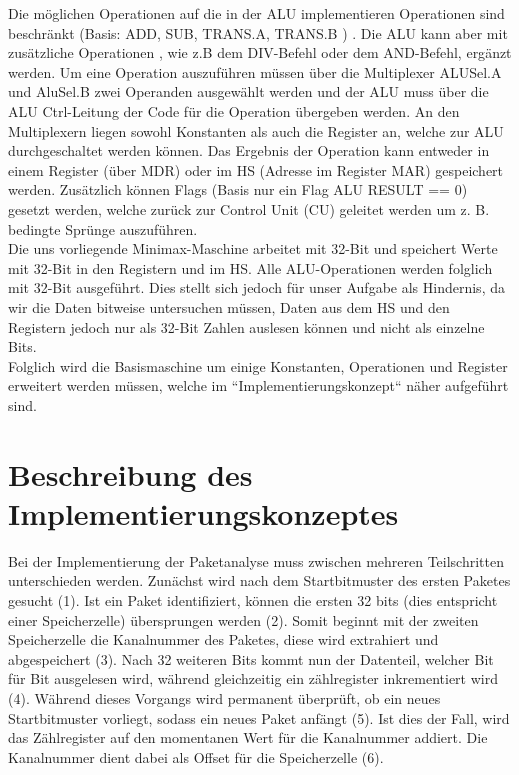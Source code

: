 \documentclass[12pt,titlepage,german,a4]{article}
\begin{document}
    Die m{\"o}glichen Operationen auf die in der ALU implementieren Operationen sind beschr{\"a}nkt (Basis:  ADD, SUB, TRANS.A, TRANS.B ) . Die ALU kann aber mit zus{\"a}tzliche Operationen , wie z.B dem DIV-Befehl oder dem AND-Befehl, erg{\"a}nzt werden.
    Um eine Operation auszuf{\"u}hren m{\"u}ssen {\"u}ber die Multiplexer ALUSel.A und AluSel.B zwei
    Operanden ausgew{\"a}hlt werden und der ALU muss {\"u}ber die ALU Ctrl-Leitung der Code
    f{\"u}r die Operation {\"u}bergeben werden. An den Multiplexern liegen sowohl Konstanten als
    auch die Register an, welche zur ALU durchgeschaltet werden k{\"o}nnen. Das Ergebnis der
    Operation kann entweder in einem Register ({\"u}ber MDR) oder im HS (Adresse im Register
    MAR) gespeichert werden. Zus{\"a}tzlich k{\"o}nnen Flags (Basis nur ein Flag ALU RESULT ==
    0) gesetzt werden, welche zur{\"u}ck zur Control Unit (CU) geleitet werden um z. B. bedingte
    Spr{\"u}nge auszuf{\"u}hren. \\
    Die uns vorliegende Minimax-Maschine arbeitet mit 32-Bit und speichert Werte mit
    32-Bit in den Registern und im HS. Alle ALU-Operationen werden folglich mit 32-Bit ausgef{\"u}hrt. Dies stellt sich jedoch f{\"u}r unser Aufgabe als Hindernis, da wir die Daten
    bitweise untersuchen m{\"u}ssen, Daten aus dem HS und den Registern jedoch nur als 32-Bit
    Zahlen auslesen k{\"o}nnen und nicht als einzelne Bits.\\
    Folglich wird die Basismaschine um einige Konstanten, Operationen und Register erweitert
    werden m{\"u}ssen, welche im “Implementierungskonzept“ n{\"a}her aufgef{\"u}hrt sind.

    \section{Beschreibung des Implementierungskonzeptes}
    Bei der Implementierung der Paketanalyse muss zwischen mehreren Teilschritten unterschieden werden. Zun{\"a}chst wird nach dem Startbitmuster des ersten Paketes gesucht (1). Ist ein Paket identifiziert, k{\"o}nnen die ersten 32 bits (dies entspricht einer Speicherzelle) {\"u}bersprungen werden (2). Somit beginnt mit der zweiten Speicherzelle die Kanalnummer des Paketes, diese wird extrahiert und abgespeichert (3). Nach 32 weiteren Bits kommt nun der Datenteil, welcher Bit f{\"u}r Bit ausgelesen wird, w{\"a}hrend gleichzeitig ein z{\"a}hlregister inkrementiert wird (4). W{\"a}hrend dieses Vorgangs wird permanent {\"u}berpr{\"u}ft, ob ein neues Startbitmuster vorliegt, sodass ein neues Paket anf{\"a}ngt (5). Ist dies der Fall, wird das Z{\"a}hlregister auf den momentanen Wert f{\"u}r die Kanalnummer addiert. Die Kanalnummer dient dabei als Offset f{\"u}r die Speicherzelle (6).
\end{document}
